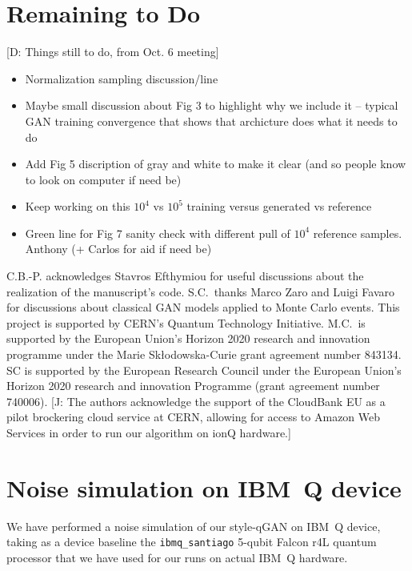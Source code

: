 \documentclass[twocolumn,preprintnumbers,superscriptaddress]{revtex4-2}
\newcommand{\commentJB}[1]{{\color{blue} {[J: #1]}}}
\newcommand{\commentDMG}[1]{{\color{orange} {[D: #1]}}}
\begin{document}
\section{Remaining to Do}
\commentDMG{Things still to do, from Oct. 6 meeting}
\begin{itemize}
\item Normalization sampling discussion/line
\item Maybe small discussion about Fig 3 to highlight why we include it -- typical GAN training convergence that shows that archicture does what it needs to do
\item Add Fig 5 discription of gray and white to make it clear (and so people know to look on computer if need be)
\item Keep working on this $10^4$ vs $10^5$ training versus generated vs reference
\item Green line for Fig 7 sanity check with different pull of $10^4$ reference samples. Anthony (+ Carlos for aid if need be)
\end{itemize}

\acknowledgments

C.B.-P. acknowledges Stavros Efthymiou for useful discussions about the
realization of the manuscript's code. S.C.~thanks Marco Zaro and Luigi Favaro for
discussions about classical GAN models applied to Monte Carlo events. This
project is supported by CERN's Quantum Technology Initiative. 
M.C.\ is supported by the European Union’s Horizon 2020 research and innovation programme under the Marie Skłodowska-Curie grant agreement number 843134.
SC is supported by the European Research
Council under the European Union's Horizon 2020 research and innovation
Programme (grant agreement number 740006). \commentJB{The authors acknowledge the support of the CloudBank EU as a pilot brockering cloud service at CERN, allowing
 for access to Amazon Web Services in order to run our algorithm on ionQ hardware.}


\appendix

\section{Noise simulation on IBM~Q device}
\label{sec:appendixnoise}

We have performed a noise simulation of our style-qGAN on IBM~Q device, taking as a device baseline the {\tt ibmq\_santiago}
5-qubit Falcon r4L quantum processor that we have used for our runs on actual IBM~Q hardware.
\end{document}
